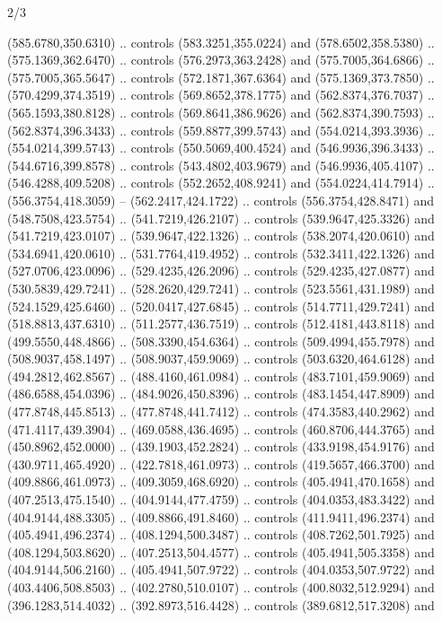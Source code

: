 \begin{flagdescription}{2/3}
\begin{scope}[shift={(0.5\flaglength,0.5\flagwidth)},scale=\flagwidth/481.3]
\begin{scope}[y=-0.8pt, x=0.8pt,shift={(-424,-300)}]
  (585.6780,350.6310) .. controls (583.3251,355.0224) and (578.6502,358.5380) ..
  (575.1369,362.6470) .. controls (576.2973,363.2428) and (575.7005,364.6866) ..
  (575.7005,365.5647) .. controls (572.1871,367.6364) and (575.1369,373.7850) ..
  (570.4299,374.3519) .. controls (569.8652,378.1775) and (562.8374,376.7037) ..
  (565.1593,380.8128) .. controls (569.8641,386.9626) and (562.8374,390.7593) ..
  (562.8374,396.3433) .. controls (559.8877,399.5743) and (554.0214,393.3936) ..
  (554.0214,399.5743) .. controls (550.5069,400.4524) and (546.9936,396.3433) ..
  (544.6716,399.8578) .. controls (543.4802,403.9679) and (546.9936,405.4107) ..
  (546.4288,409.5208) .. controls (552.2652,408.9241) and (554.0224,414.7914) ..
  (556.3754,418.3059) -- (562.2417,424.1722) .. controls (556.3754,428.8471) and
  (548.7508,423.5754) .. (541.7219,426.2107) .. controls (539.9647,425.3326) and
  (541.7219,423.0107) .. (539.9647,422.1326) .. controls (538.2074,420.0610) and
  (534.6941,420.0610) .. (531.7764,419.4952) .. controls (532.3411,422.1326) and
  (527.0706,423.0096) .. (529.4235,426.2096) .. controls (529.4235,427.0877) and
  (530.5839,429.7241) .. (528.2620,429.7241) .. controls (523.5561,431.1989) and
  (524.1529,425.6460) .. (520.0417,427.6845) .. controls (514.7711,429.7241) and
  (518.8813,437.6310) .. (511.2577,436.7519) .. controls (512.4181,443.8118) and
  (499.5550,448.4866) .. (508.3390,454.6364) .. controls (509.4994,455.7978) and
  (508.9037,458.1497) .. (508.9037,459.9069) .. controls (503.6320,464.6128) and
  (494.2812,462.8567) .. (488.4160,461.0984) .. controls (483.7101,459.9069) and
  (486.6588,454.0396) .. (484.9026,450.8396) .. controls (483.1454,447.8909) and
  (477.8748,445.8513) .. (477.8748,441.7412) .. controls (474.3583,440.2962) and
  (471.4117,439.3904) .. (469.0588,436.4695) .. controls (460.8706,444.3765) and
  (450.8962,452.0000) .. (439.1903,452.2824) .. controls (433.9198,454.9176) and
  (430.9711,465.4920) .. (422.7818,461.0973) .. controls (419.5657,466.3700) and
  (409.8866,461.0973) .. (409.3059,468.6920) .. controls (405.4941,470.1658) and
  (407.2513,475.1540) .. (404.9144,477.4759) .. controls (404.0353,483.3422) and
  (404.9144,488.3305) .. (409.8866,491.8460) .. controls (411.9411,496.2374) and
  (405.4941,496.2374) .. (408.1294,500.3487) .. controls (408.7262,501.7925) and
  (408.1294,503.8620) .. (407.2513,504.4577) .. controls (405.4941,505.3358) and
  (404.9144,506.2160) .. (405.4941,507.9722) .. controls (404.0353,507.9722) and
  (403.4406,508.8503) .. (402.2780,510.0107) .. controls (400.8032,512.9294) and
  (396.1283,514.4032) .. (392.8973,516.4428) .. controls (389.6812,517.3208) and

\end{scope}
\end{scope}
\end{flagdescription}
